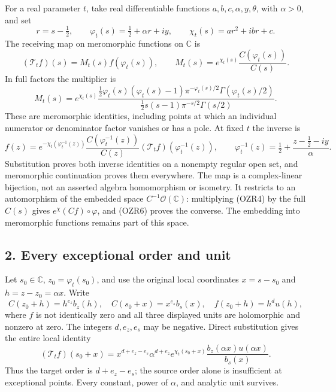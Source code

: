 \documentclass[
  10pt,
  a4paper,
]{article}
\begin{document}
For a real parameter \(t\), take real differentiable functions
\(a,b,c,\alpha,y,\theta\), with \(\alpha>0\), and set \[
r=s-\tfrac12,\qquad
\varphi_t(s)=\tfrac12+\alpha r+iy,\qquad
\chi_t(s)=ar^2+ibr+c.
\tag{OZR3}
\] The receiving map on meromorphic functions on \(\mathbb C\) is \[
(\mathcal T_t f)(s)=M_t(s)f(\varphi_t(s)),\qquad
M_t(s)=e^{\chi_t(s)}\frac{C(\varphi_t(s))}{C(s)}.
\tag{OZR4}
\] In full factors the multiplier is \[
M_t(s)=e^{\chi_t(s)}
\frac{\tfrac12\varphi_t(s)(\varphi_t(s)-1)
 \pi^{-\varphi_t(s)/2}\Gamma(\varphi_t(s)/2)}
 {\tfrac12s(s-1)\pi^{-s/2}\Gamma(s/2)}.
\tag{OZR5}
\] These are meromorphic identities, including points at which an
individual numerator or denominator factor vanishes or has a pole. At
fixed \(t\) the inverse is \[
f(z)=e^{-\chi_t(\varphi_t^{-1}(z))}
\frac{C(\varphi_t^{-1}(z))}{C(z)}
(\mathcal T_t f)(\varphi_t^{-1}(z)),\qquad
\varphi_t^{-1}(z)=\tfrac12+\frac{z-\tfrac12-iy}{\alpha}.
\tag{OZR6}
\] Substitution proves both inverse identities on a nonempty regular
open set, and meromorphic continuation proves them everywhere. The map
is a complex-linear bijection, not an asserted algebra homomorphism or
isometry. It restricts to an automorphism of the embedded space
\(C^{-1}\mathcal O(\mathbb C)\): multiplying (OZR4) by the full \(C(s)\)
gives \(e^\chi(Cf)\circ\varphi\), and (OZR6) proves the converse. The
embedding into meromorphic functions remains part of this space.

\subsection{2. Every exceptional order and
unit}\label{every-exceptional-order-and-unit}

Let \(s_0\in\mathbb C\), \(z_0=\varphi_t(s_0)\), and use the original
local coordinates \(x=s-s_0\) and \(h=z-z_0=\alpha x\). Write \[
C(z_0+h)=h^{e_z}b_z(h),\quad
C(s_0+x)=x^{e_s}b_s(x),\quad
f(z_0+h)=h^d u(h),
\tag{OZR7}
\] where \(f\) is not identically zero and all three displayed units are
holomorphic and nonzero at zero. The integers \(d,e_z,e_s\) may be
negative. Direct substitution gives the entire local identity \[
\boxed{(\mathcal T_t f)(s_0+x)=
x^{d+e_z-e_s}\alpha^{d+e_z}
e^{\chi_t(s_0+x)}\frac{b_z(\alpha x)u(\alpha x)}{b_s(x)}.}
\tag{OZR8}
\] Thus the target order is \(d+e_z-e_s\); the source order alone is
insufficient at exceptional points. Every constant, power of \(\alpha\),
and analytic unit survives.
\end{document}
